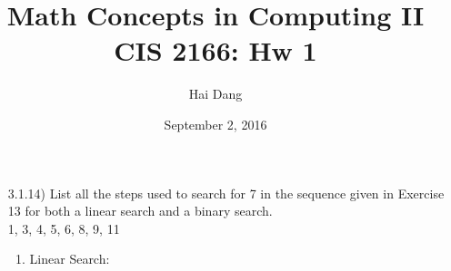 \documentclass[fleqn]{article}
\begin{document}
\title{Math Concepts in Computing II CIS 2166: Hw 1}
\date{September 2, 2016}
\author{Hai Dang}
\maketitle

\begin{enumerate}
\item[3.1.14)]
List all the steps used to search for 7 in the sequence given
in Exercise 13 for both a linear search and a binary search.
\\
1, 3, 4, 5, 6, 8, 9, 11
	\newarray\Values
    \begin{enumerate}
    \item %
    	Linear Search:
    	\newcommand{\num}{7}
    	\newcommand{\length}{9} %
    	\setcounter{i}{1}
    	\setcounter{pt}{1}
    	

\end{enumerate}
\end{enumerate}
\end{document}
